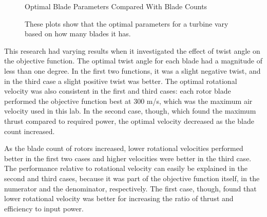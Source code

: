 \documentclass{article}
\begin{document}
\begin{figure}
  \centering

  \hspace{1em}
  \caption{Optimal Blade Parameters Compared With Blade Counts}
  \captionsetup{aboveskip=0pt,font=it}
  \caption*{These plots show that the optimal parameters for a turbine vary based on how many blades it has.}
  \label{fig:1}
\end{figure}

 This research had varying results when it investigated the effect of twist angle on the objective function. The optimal twist angle for each blade had a magnitude of less than one degree. In the first two functions, it was a slight negative twist, and in the third case a slight positive twist was better. The optimal rotational velocity was also consistent in the first and third cases: each rotor blade performed the objective function best at 300 m/s, which was the maximum air velocity used in this lab. In the second case, though, which found the maximum thrust compared to required power, the optimal velocity decreased as the blade count increased. \newline
 
 As the blade count of rotors increased, lower rotational velocities performed better in the first two cases and higher velocities were better in the third case. The performance relative to rotational velocity can easily be explained in the second and third cases, because it was part of the objective function itself, in the numerator and the denominator, respectively. The first case, though, found that lower rotational velocity was better for increasing the ratio of thrust and efficiency to input power. \newline
 
\end{document}
